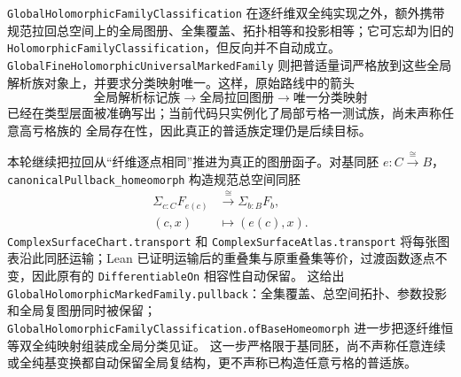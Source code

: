 \documentclass[UTF8,fontset=none,a4paper,11pt]{ctexart}
\begin{document}
\texttt{GlobalHolomorphic\allowbreak Family\allowbreak Classification} 在逐纤维双全纯实现之外，额外携带
规范拉回总空间上的全局图册、全集覆盖、拓扑相等和投影相等；它可忘却为旧的
\texttt{HolomorphicFamily\allowbreak Classification}，但反向并不自动成立。\texttt{GlobalFineHolomorphicUniversal\allowbreak Marked\allowbreak Family}
则把普适量词严格放到这些全局解析族对象上，并要求分类映射唯一。这样，原始路线中的箭头
\[
  \text{全局解析标记族}\longrightarrow\text{全局拉回图册}\longrightarrow\text{唯一分类映射}
\]
已经在类型层面被准确写出；当前代码只实例化了局部亏格一测试族，尚未声称任意高亏格族的
全局存在性，因此真正的普适族定理仍是后续目标。

本轮继续把拉回从“纤维逐点相同”推进为真正的图册函子。对基同胚
\(e:C\mathbin{\xrightarrow{\cong}}B\)，
\texttt{canonicalPullback\_homeomorph} 构造规范总空间同胚
\[
  \begin{aligned}
  \Sigma_{c:C}F_{e(c)}&\xrightarrow{\cong}\Sigma_{b:B}F_b,\\
  (c,x)&\longmapsto(e(c),x).
  \end{aligned}
\]
\texttt{ComplexSurfaceChart.transport} 和
\texttt{ComplexSurfaceAtlas.transport} 将每张图表沿此同胚运输；Lean 已证明运输后的重叠集与原重叠集等价，过渡函数逐点不变，因此原有的
\texttt{DifferentiableOn} 相容性自动保留。
这给出 \texttt{GlobalHolomorphic\allowbreak Marked\allowbreak Family\allowbreak.pullback}：全集覆盖、总空间拓扑、参数投影和全局复图册同时被保留；
\texttt{GlobalHolomorphic\allowbreak Family\allowbreak Classification\allowbreak.ofBaseHomeomorph} 进一步把逐纤维恒等双全纯映射组装成全局分类见证。
这一步严格限于基同胚，尚不声称任意连续或全纯基变换都自动保留全局复结构，更不声称已构造任意亏格的普适族。
\end{document}
